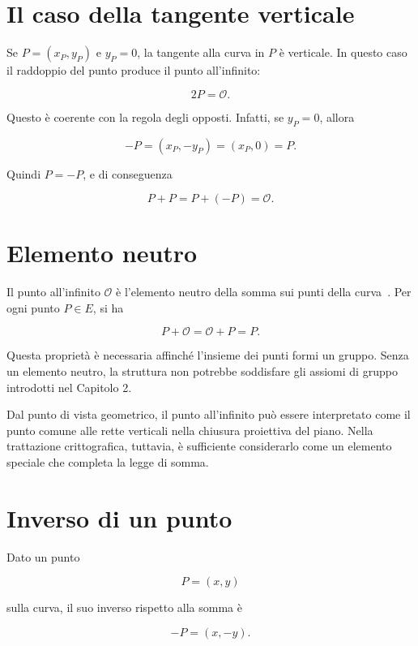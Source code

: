 \documentclass[12pt,a4paper,oneside]{report}
\begin{document}
\section{Il caso della tangente verticale}

Se \(P=(x_P,y_P)\) e \(y_P=0\), la tangente alla curva in \(P\) è verticale. In questo caso il raddoppio del punto produce il punto all'infinito:

\begin{equation}
    2P = \mathcal{O}.
\end{equation}

Questo è coerente con la regola degli opposti. Infatti, se \(y_P=0\), allora

\[
-P=(x_P,-y_P)=(x_P,0)=P.
\]

Quindi \(P=-P\), e di conseguenza

\[
P+P=P+(-P)=\mathcal{O}.
\]

\section{Elemento neutro}

Il punto all'infinito \(\mathcal{O}\) è l'elemento neutro della somma sui punti della curva~\cite{margara_ec}. Per ogni punto \(P \in E\), si ha

\begin{equation}
    P+\mathcal{O}=\mathcal{O}+P=P.
\end{equation}

Questa proprietà è necessaria affinché l'insieme dei punti formi un gruppo. Senza un elemento neutro, la struttura non potrebbe soddisfare gli assiomi di gruppo introdotti nel Capitolo 2.

Dal punto di vista geometrico, il punto all'infinito può essere interpretato come il punto comune alle rette verticali nella chiusura proiettiva del piano. Nella trattazione crittografica, tuttavia, è sufficiente considerarlo come un elemento speciale che completa la legge di somma.

\section{Inverso di un punto}

Dato un punto

\[
P=(x,y)
\]

sulla curva, il suo inverso rispetto alla somma è

\begin{equation}
    -P=(x,-y).
\end{equation}
\end{document}
